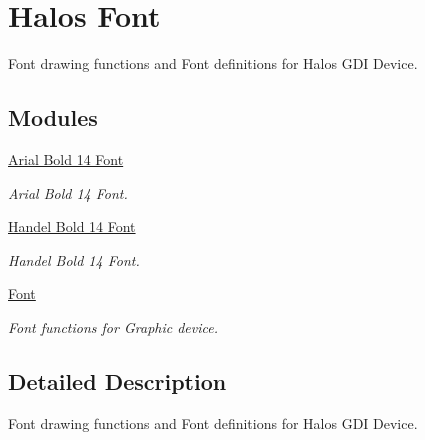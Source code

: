 \hypertarget{group___f_o_n_t_s}{
\section{Halos Font}
\label{group___f_o_n_t_s}
}
Font drawing functions and Font definitions for Halos GDI Device.  


\subsection*{Modules}
\begin{CompactItemize}
\item 
\hyperlink{group__graphic__device__font__arial14}{Arial Bold 14 Font}
\begin{CompactList}\small\item\em Arial Bold 14 Font. \item\end{CompactList}

\item 
\hyperlink{group__graphic__device__font__handel14}{Handel Bold 14 Font}
\begin{CompactList}\small\item\em Handel Bold 14 Font. \item\end{CompactList}

\item 
\hyperlink{group__graphic__device__font}{Font}
\begin{CompactList}\small\item\em Font functions for Graphic device. \item\end{CompactList}

\end{CompactItemize}


\subsection{Detailed Description}
Font drawing functions and Font definitions for Halos GDI Device. 